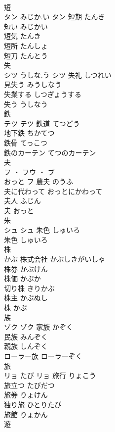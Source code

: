 \documentclass[8pt]{extreport}
\begin{document}
\begin{CJK}{UTF8}{min}
\\	短	
\\	タン	みじか.い	タン	短期	たんき	
\\	短い	みじかい	
\\	短気	たんき	
\\	短所	たんしょ	
\\	短刀	たんとう	
\\	失	
\\	シツ	うしな.う	シツ	失礼	しつれい	
\\	見失う	みうしなう	
\\	失業する	しつぎょうする	
\\	失う	うしなう	
\\	鉄	
\\	テツ		テツ	鉄道	てつどう	
\\	地下鉄	ちかてつ	
\\	鉄骨	てっこつ	
\\	鉄のカーテン	てつのカーテン	
\\	夫	
\\	フ ・ フウ ・ ブ
\\	おっと	フ	農夫	のうふ	
\\	夫に代わって	おっとにかわって	
\\	夫人	ふじん	
\\	夫	おっと	
\\	朱	
\\	シュ		シュ	朱色	しゅいろ	
\\	朱色	しゅいろ	
\\	株	
\\	かぶ		株式会社	かぶしきがいしゃ	
\\	株券	かぶけん	
\\	株価	かぶか	
\\	切り株	きりかぶ	
\\	株主	かぶぬし	
\\	株	かぶ	
\\	族	
\\	ゾク		ゾク	家族	かぞく	
\\	民族	みんぞく	
\\	親族	しんぞく	
\\	ローラー族	ローラーぞく	
\\	旅	
\\	リョ	たび	リョ	旅行	りょこう	
\\	旅立つ	たびだつ	
\\	旅券	りょけん	
\\	独り旅	ひとりたび	
\\	旅館	りょかん	
\\	遊	

\end{CJK}
\end{document}
